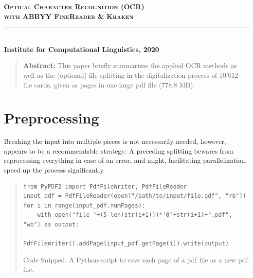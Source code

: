 

\usepackage{wasysym}
\newenvironment{rcases}
  {\left.\begin{aligned}}
  {\end{aligned}\right\rbrace}
\usepackage{nicefrac}
\usepackage{pifont}%
\newcommand{\cmark}{\ding{51}}%
\newcommand{\xmark}{\ding{55}}%



\begin{center}
\noindent
{\LARGE \textsc{\textbf{Optical Character Recognition (OCR)}}}\\
\vspace*{-0.cm}
\vspace*{0.1cm}
{\LARGE \textsc{\textbf{with ABBYY FineReader \& Kraken}}}\\

\vspace*{-0.2cm}
\rule{0.75\textwidth}{2pt}\\
\vspace*{-0.0cm}
{
	\textbf{Institute for Computational Linguistics, 2020}\\
}

\begin{quote}
\textbf{Abstract:} This paper briefly summarizes the applied OCR methods as well as the (optional) file splitting in the digitalization process of 10'012 file cards, given as pages in one large pdf file (778.8 MB).
\end{quote}

\end{center}



\noindent
\section{Preprocessing}

\noindent
Breaking the input into multiple pieces is not necessarily needed, however,  appears to be a recommendable strategy: A preceding splitting bewares from reprocessing everything in case of an error, and might, facilitating parallelization, speed up the process significantly.

\medskip

\vspace*{-0.1cm}
\begin{quote}
\begin{lstlisting}
from PyPDF2 import PdfFileWriter, PdfFileReader
input_pdf = PdfFileReader(open("/path/to/input/file.pdf", "rb"))
for i in range(input_pdf.numPages):
    with open("file_"+(5-len(str(i+1)))*'0'+str(i+1)+".pdf", "wb") as output:
        PdfFileWriter().addPage(input_pdf.getPage(i)).write(output)
\end{lstlisting}
\begin{center}
\vspace*{-1.4cm}
Code Snipped: A Python-script to save each page of a pdf file as a new pdf file.
\end{center}
\end{quote}

